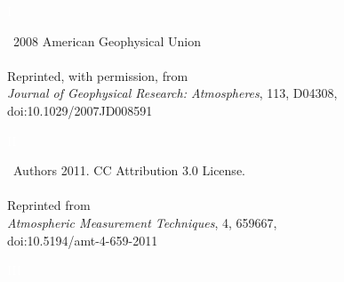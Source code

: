 \documentclass[11pt,b5paper]{book}
\begin{document}



\begingroup
\let\cleardoublepage\clearpage

\endgroup



\newpage
\clearpage
\thispagestyle{empty}
\mbox{}
\newpage
\clearpage
\thispagestyle{empty}
\vspace*{-4.1cm} \begin{tcolorbox}[left skip=13.8cm,colframe=black,width=1.3cm,height=5cm,colback={black},outer arc=0mm,valign=center]    
  \vspace*{-1cm}\hspace*{-0.01cm}\Huge{\textcolor{white}{I}}
\end{tcolorbox}
\vspace*{2cm}
\noindent{}\textcopyright~2008 American Geophysical Union \\
\\
\noindent{}Reprinted, with permission, from \\
\noindent{}\textit{Journal of Geophysical Research: Atmospheres}, 113, D04308, \\
\noindent{}doi:10.1029/2007JD008591
\newpage
\clearpage
\thispagestyle{empty}
\mbox{}
\newpage
\clearpage
%
\newpage
\clearpage
\thispagestyle{empty}
\vspace*{2cm} \begin{tcolorbox}[left skip=13.8cm,colframe=black,width=1.3cm,height=5cm,colback={black},outer arc=0mm,valign=center]
  \vspace*{-1cm}\hspace*{-0.16cm}\Huge{\textcolor{white}{II}}
\end{tcolorbox}
\vspace*{-4cm}
\noindent{}\textcopyright~Authors 2011. CC Attribution 3.0 License. \\
\\
\noindent{}Reprinted from \\
\noindent{}\textit{Atmospheric Measurement Techniques}, 4,  659\textendash{}667, \\
\noindent{}doi:10.5194/amt-4-659-2011
\newpage
\clearpage
\thispagestyle{empty}
\mbox{}
\newpage
\clearpage
%
\thispagestyle{empty}
\mbox{}
\thispagestyle{empty}
\vspace*{10cm} \begin{tcolorbox}[left skip=13.8cm,colframe=black,width=1.3cm,height=5cm,colback={black},outer arc=0mm,valign=center]
  \vspace*{-1cm}\hspace*{-0.33cm}\Huge{\textcolor{white}{III}}
\end{tcolorbox}
\end{document}

